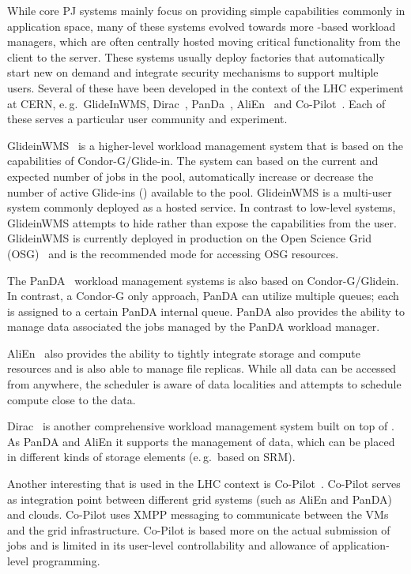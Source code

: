 \documentclass{sig-alternate}
\begin{document}
While core PJ systems mainly focus on providing simple \pilot capabilities
commonly in application space, many of these systems evolved towards more
\pilot-based workload managers, which are often centrally hosted moving
critical functionality from the client to the server. These systems usually
deploy \pilot factories that automatically start new \pilots on demand and
integrate security mechanisms to support multiple users. Several of these have
been developed in the context of the LHC experiment at CERN, e.\,g.\
GlideInWMS, Dirac~\cite{1742-6596-219-6-062049},
PanDa~\cite{1742-6596-331-7-072069}, AliEn~\cite{1742-6596-119-6-062012} and
Co-Pilot~\cite{copilot-tr}. Each of these \pilots serves a particular user
community and experiment.

GlideinWMS~\cite{1742-6596-119-6-062044} is a higher-level workload management
system that is based on the \pilot capabilities of Condor-G/Glide-in. The
system can based on the current and expected number of jobs in the pool,
automatically increase or decrease the number of active Glide-ins (\pilots)
available to the pool. GlideinWMS is a multi-user \pilotjob system commonly
deployed as a hosted service. In contrast to low-level \pilotjob systems,
GlideinWMS attempts to hide rather than expose the \pilot capabilities from
the user. GlideinWMS is currently deployed in production on the Open Science
Grid (OSG)~\cite{url_osg} and is the recommended mode for accessing OSG resources.

The PanDA~\cite{1742-6596-331-7-072069} workload management systems is also
based on Condor-G/Glidein. In contrast, a Condor-G only approach,
PanDA can utilize multiple queues; each \pilot is assigned to a certain PanDA
internal queue. PanDA also provides the ability to manage data associated the
jobs managed by the PanDA workload manager.

AliEn~\cite{1742-6596-119-6-062012} also provides the ability to tightly
integrate storage and compute resources and is also able to manage file
replicas. While all data can be accessed from anywhere, the scheduler is aware
of data localities and attempts to schedule compute close to the data.

Dirac~\cite{1742-6596-219-6-062049} is another comprehensive workload
management system built on top of \pilots. As PanDA and AliEn it supports the
management of data, which can be placed in different kinds of storage elements
(e.\,g.\ based on SRM).

Another interesting \pilot that is used in the LHC context is
Co-Pilot~\cite{copilot-tr}. Co-Pilot serves as integration point between
different grid \pilotjob systems (such as AliEn and PanDA) and clouds.
Co-Pilot uses XMPP messaging to communicate between the VMs and the grid
infrastructure. Co-Pilot is based more on the actual submission of jobs and is
limited in its user-level controllability and allowance of application-level
programming.
\end{document}
